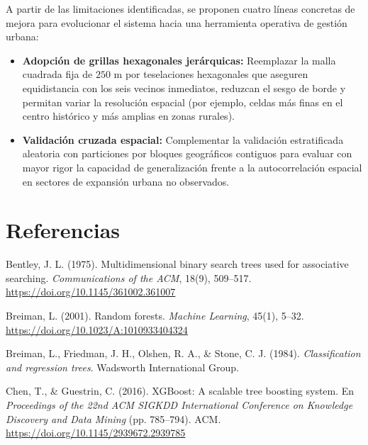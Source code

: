 \documentclass[11pt,a4paper]{article}
\begin{document}
A partir de las limitaciones identificadas, se proponen cuatro líneas concretas de mejora para evolucionar el sistema hacia una herramienta operativa de gestión urbana:
\begin{itemize}[leftmargin=0.8cm, itemsep=2pt]
    \item \textbf{Adopción de grillas hexagonales jerárquicas:} Reemplazar la malla cuadrada fija de $250\text{ m}$ por teselaciones hexagonales que aseguren equidistancia con los seis vecinos inmediatos, reduzcan el sesgo de borde y permitan variar la resolución espacial (por ejemplo, celdas más finas en el centro histórico y más amplias en zonas rurales).
    \item \textbf{Validación cruzada espacial:} Complementar la validación estratificada aleatoria con particiones por bloques geográficos contiguos para evaluar con mayor rigor la capacidad de generalización frente a la autocorrelación espacial en sectores de expansión urbana no observados.
\end{itemize}

\newpage
\section*{Referencias}

\begingroup
\setlength{\parindent}{0pt}
\setlength{\parskip}{5pt}
\small

\hangindent=1.0cm 
Bentley, J. L. (1975). Multidimensional binary search trees used for associative searching. \textit{Communications of the ACM}, 18(9), 509--517. \url{https://doi.org/10.1145/361002.361007}

\hangindent=1.0cm 
Breiman, L. (2001). Random forests. \textit{Machine Learning}, 45(1), 5--32. \url{https://doi.org/10.1023/A:1010933404324}

\hangindent=1.0cm 
Breiman, L., Friedman, J. H., Olshen, R. A., \& Stone, C. J. (1984). \textit{Classification and regression trees}. Wadsworth International Group.

\hangindent=1.0cm 
Chen, T., \& Guestrin, C. (2016). XGBoost: A scalable tree boosting system. En \textit{Proceedings of the 22nd ACM SIGKDD International Conference on Knowledge Discovery and Data Mining} (pp. 785--794). ACM. \url{https://doi.org/10.1145/2939672.2939785}
\end{document}
